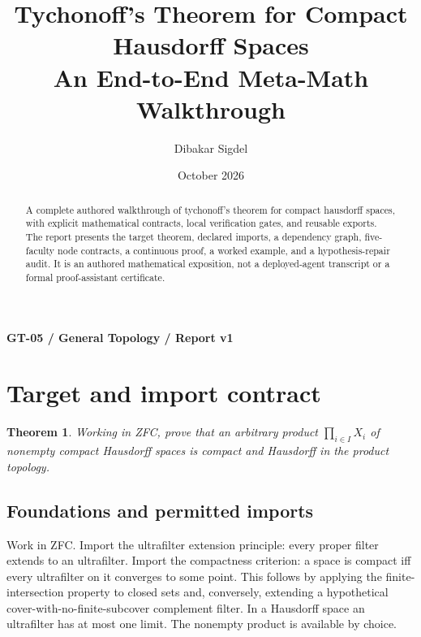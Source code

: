 \documentclass[preprint,12pt,aps,pra,showkeys,amsmath,amssymb,superscriptaddress,floatfix]{revtex4-2}
\newtheorem{theorem}{Theorem}[section]
\theoremstyle{definition}
\theoremstyle{remark}
\begin{document}
\title{Tychonoff's Theorem for Compact Hausdorff Spaces\\[4pt]\large An End-to-End Meta-Math Walkthrough}

\author{Dibakar Sigdel}


\date{October 2026}

\begin{abstract}

A complete authored walkthrough of tychonoff's theorem for compact
hausdorff spaces, with explicit mathematical contracts, local
verification gates, and reusable exports. The report presents the target
theorem, declared imports, a dependency graph, five-faculty node
contracts, a continuous proof, a worked example, and a hypothesis-repair
audit. It is an authored mathematical exposition, not a deployed-agent
transcript or a formal proof-assistant certificate.

\end{abstract}\maketitle\linespread{1.12}\selectfont

\noindent\textbf{GT-05 / General Topology / Report v1}

\section{Target and import contract}

\begin{theorem}

Working in ZFC, prove that an arbitrary product \(\prod_{i\in I}X_i\) of
nonempty compact Hausdorff spaces is compact and Hausdorff in the
product topology.

\end{theorem}

\subsection{Foundations and permitted imports}

Work in ZFC. Import the ultrafilter extension principle: every proper
filter extends to an ultrafilter. Import the compactness criterion: a
space is compact iff every ultrafilter on it converges to some point.
This follows by applying the finite-intersection property to closed sets
and, conversely, extending a hypothetical cover-with-no-finite-subcover
complement filter. In a Hausdorff space an ultrafilter has at most one
limit. The nonempty product is available by choice.
\end{document}

